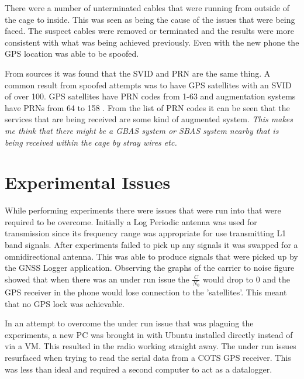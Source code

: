 There were a number of unterminated cables that were running from outside of the cage to inside. This was seen as being the cause of the issues that were being faced. The
suspect cables were removed or terminated and the results were more consistent with what was being achieved previously. Even with the new phone the GPS location was able
to be spoofed.

From sources  it was found that the SVID and PRN are the same thing. 
A common result from spoofed attempts was to have GPS satellites with an SVID of over 100. GPS satellites have PRN codes from 1-63 and augmentation systems have PRNs from
64 to 158 \cite{RN67}. From the list of PRN codes \cite{RN67} it can be seen that the services that are being received are some kind of augmented system. \emph{This makes
me think that there might be a GBAS system or SBAS system nearby that is being received within the cage by stray wires etc.}

\section{Experimental Issues}
While performing experiments there were issues that were run into that were required to be overcome. Initially a Log Periodic antenna was used for transmission since its
frequency range was appropriate for use transmitting L1 band signals. After experiments failed to pick up any signals it was swapped for a omnidirectional antenna. This
was able to produce signals that were picked up by the GNSS Logger application. Observing the graphs of the carrier to noise figure showed that when there was an under run
issue the $\frac{C}{N_0}$ would drop to 0 and the GPS receiver in the phone would lose connection to the 'satellites'. This meant that no GPS lock was achievable.  

In an attempt to overcome the under run issue that was plaguing the experiments, a new PC was brought in with Ubuntu installed directly instead of via a VM. This resulted
in the radio working straight away. The under run issues resurfaced when trying to read the serial data from a COTS GPS receiver. This was less than ideal and required a
second computer to act as a datalogger.
